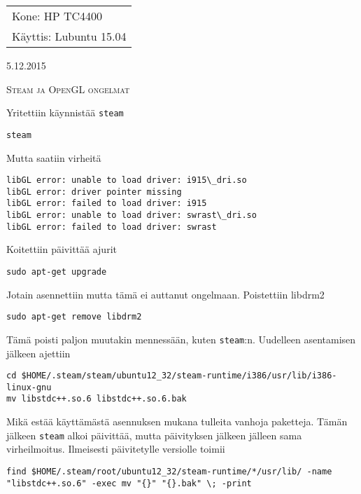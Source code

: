 \documentclass[main.tex]{subfiles}
\begin{document}
\thispagestyle{empty}
\begin{tabular}[t]{l}
Kone: HP TC4400\\
Käyttis: Lubuntu 15.04
\end{tabular}
\hfill 5.12.2015

{\scshape\Large{Steam ja OpenGL ongelmat}}

Yritettiin käynnistää \texttt{steam}

\begin{lstlisting}
steam
\end{lstlisting}

Mutta saatiin virheitä

\begin{lstlisting}
libGL error: unable to load driver: i915\_dri.so
libGL error: driver pointer missing
libGL error: failed to load driver: i915
libGL error: unable to load driver: swrast\_dri.so
libGL error: failed to load driver: swrast
\end{lstlisting}

Koitettiin päivittää ajurit

\begin{lstlisting}
sudo apt-get upgrade
\end{lstlisting}

Jotain asennettiin mutta tämä ei auttanut ongelmaan. Poistettiin libdrm2

\begin{lstlisting}
sudo apt-get remove libdrm2
\end{lstlisting}

Tämä poisti paljon muutakin mennessään, kuten \texttt{steam}:n. Uudelleen asentamisen jälkeen ajettiin

\begin{lstlisting}
cd $HOME/.steam/steam/ubuntu12_32/steam-runtime/i386/usr/lib/i386-linux-gnu
mv libstdc++.so.6 libstdc++.so.6.bak
\end{lstlisting}

Mikä estää käyttämästä asennuksen mukana tulleita vanhoja paketteja. Tämän jälkeen \texttt{steam} alkoi päivittää, mutta päivityksen jälkeen jälleen sama virheilmoitus. Ilmeisesti päivitetylle versiolle toimii

\begin{lstlisting}
find $HOME/.steam/root/ubuntu12_32/steam-runtime/*/usr/lib/ -name "libstdc++.so.6" -exec mv "{}" "{}.bak" \; -print
\end{lstlisting}
\end{document}
